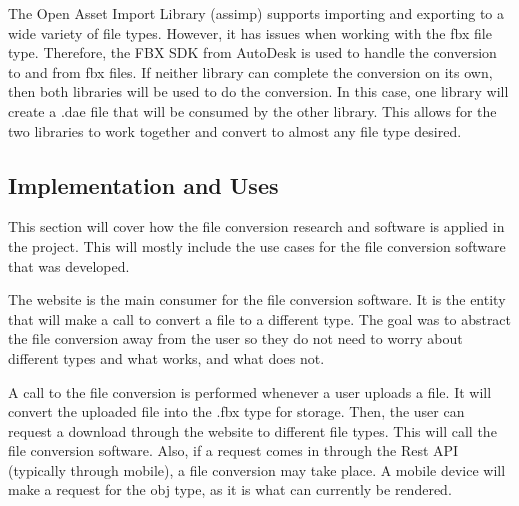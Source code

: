         The Open Asset Import Library (assimp) supports importing and exporting to a wide variety of file types.  However, it has issues when working with the fbx file type.  Therefore, the FBX SDK from AutoDesk is used to handle the conversion to and from fbx files.  If neither library can complete the conversion on its own, then both libraries will be used to do the conversion.  In this case, one library will create a .dae file that will be consumed by the other library.  This allows for the two libraries to work together and convert to almost any file type desired.

    \subsection{Implementation and Uses}

        This section will cover how the file conversion research and software is applied in the project.  This will mostly include the use cases for the file conversion software that was developed.

        The website is the main consumer for the file conversion software.  It is the entity that will make a call to convert a file to a different type.  The goal was to abstract the file conversion away from the user so they do not need to worry about different types and what works, and what does not.  
            
        A call to the file conversion is performed whenever a user uploads a file.  It will convert the uploaded file into the .fbx type for storage.  Then, the user can request a download through the website to different file types.  This will call the file conversion software.  Also, if a request comes in through the Rest API (typically through mobile), a file conversion may take place.  A mobile device will make a request for the obj type, as it is what can currently be rendered.
